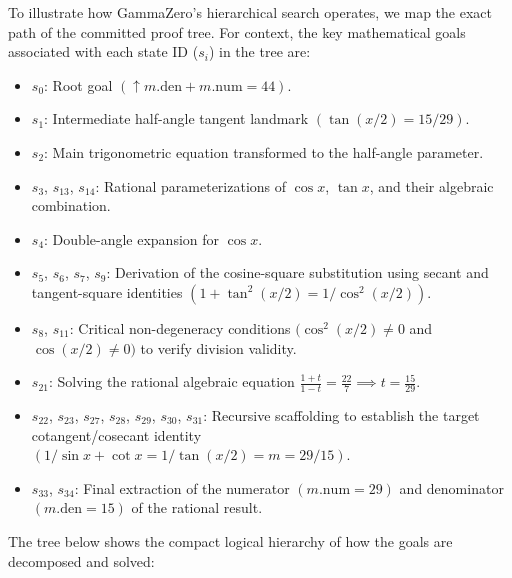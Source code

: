 To illustrate how GammaZero's hierarchical search operates, we map the exact path of the committed
proof tree. For context, the key mathematical goals associated with each state ID (\(s_i\)) in the tree
are:
\begin{itemize}
    \item \(s_0\): Root goal \((\uparrow m.\mathrm{den} + m.\mathrm{num} = 44)\).
    \item \(s_1\): Intermediate half-angle tangent landmark \((\tan(x/2) = 15/29)\).
    \item \(s_2\): Main trigonometric equation transformed to the half-angle parameter.
    \item \(s_3\), \(s_{13}\), \(s_{14}\): Rational parameterizations of \(\cos x\), \(\tan x\), and their algebraic combination.
    \item \(s_4\): Double-angle expansion for \(\cos x\).
    \item \(s_5\), \(s_6\), \(s_7\), \(s_9\): Derivation of the cosine-square substitution using secant and tangent-square identities \((1 + \tan^2(x/2) = 1/\cos^2(x/2))\).
    \item \(s_8\), \(s_{11}\): Critical non-degeneracy conditions \((\cos^2(x/2) \neq 0\) and \(\cos(x/2) \neq 0)\) to verify division validity.
    \item \(s_{21}\): Solving the rational algebraic equation \(\frac{1+t}{1-t} = \frac{22}{7} \implies t = \frac{15}{29}\).
    \item \(s_{22}\), \(s_{23}\), \(s_{27}\), \(s_{28}\), \(s_{29}\), \(s_{30}\), \(s_{31}\): Recursive scaffolding to establish the target cotangent/cosecant identity \((1/\sin x + \cot x = 1/\tan(x/2) = m = 29/15)\).
    \item \(s_{33}\), \(s_{34}\): Final extraction of the numerator \((m.\mathrm{num} = 29)\) and denominator \((m.\mathrm{den} = 15)\) of the rational result.
\end{itemize}

The tree below shows the compact logical hierarchy of how the goals are decomposed and solved:

